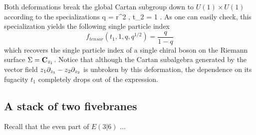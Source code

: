 \documentclass[11pt]{amsart}
\begin{document}
Both deformations break the global Cartan subgroup down to $U(1) \times U(1)$ according to the specializations
\beqn\label{eqn:special1}
q = r^2 , \quad t_2 = 1 .
\eeqn
As one can easily check, this specialization yields the following single particle index
\[
f_{tensor}(t_1, 1, q, q^{1/2}) = \frac{q}{1-q} 
\]
which recovers the single particle index of a single chiral boson on the Riemann surface $\Sigma = \mathbf{C}_{z_1}$. 
Notice that although the Cartan subalgebra generated by the vector field $z_1 \partial_{z_1} - z_2 \partial_{z_2}$ is unbroken by this deformation, the dependence on its fugacity $t_1$ completely drops out of the expression.

%
%

\subsection{A stack of two fivebranes}

\parsec[]

Recall that the even part of $E(3|6)$ ... 
\end{document}

